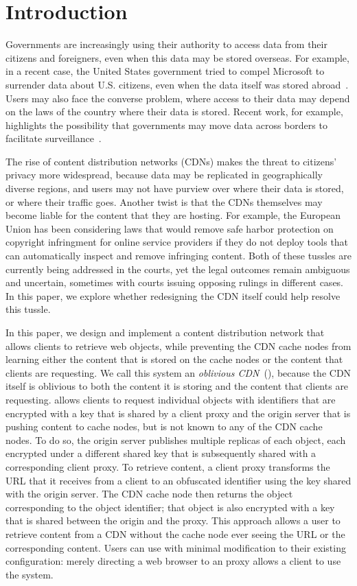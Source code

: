 \section{Introduction}
\label{sec:intro}

Governments are increasingly using their authority to access data from
their citizens and foreigners, even when this data may be stored overseas.  For
example, in a
recent case, the United States government tried to compel Microsoft to
surrender data about U.S. citizens, even when the data itself was stored
abroad~\cite{microsoft_ireland}. Users may also face the converse problem, where access to their data
may depend on the laws of the country where their data is stored. Recent work,
for example, highlights the possibility that governments may move data across
borders to facilitate surveillance~\cite{arnbak2015loopholes}.  

The rise of content distribution networks (CDNs) makes the threat to citizens'
privacy more widespread, because data may be replicated in geographically
diverse regions, and users may not have purview over where their data is
stored, or where their traffic goes. Another twist is that the CDNs themselves
may become liable for the content that they are hosting. For example, the
European Union has been considering laws that would remove safe harbor
protection on copyright infringment for online service providers if they do
not deploy tools that can automatically inspect and remove infringing content.
Both of these tussles are currently being addressed in the courts, yet the
legal outcomes remain ambiguous and uncertain, sometimes with courts issuing
opposing rulings in different cases. In this paper, we explore whether redesigning
the CDN itself could help resolve this tussle.


In this paper, we design and implement a content distribution network that
allows clients to retrieve web objects, while preventing the CDN cache nodes
from learning either the content that is stored on the cache nodes or the
content that clients are requesting. We call this system an {\em oblivious
CDN}~(\system{}), because the CDN itself is oblivious to both the content it is
storing and the content that clients are requesting. \system{} allows clients to
request individual objects with identifiers that are encrypted with a key that
is shared by a client proxy and the origin server that is pushing content to
cache nodes, but is not known to any of the CDN cache nodes.  To do so, the
origin server publishes multiple replicas of each object, each encrypted under
a different shared key that is subsequently shared with a corresponding client
proxy. To retrieve content, a client proxy transforms the URL that it receives
from a client to an obfuscated identifier using the key shared with the origin
server. The CDN cache node then returns the object corresponding to the object
identifier; that object is also encrypted with a key that is shared between
the origin and the proxy. This approach allows a user to retrieve content from
a CDN without the cache node ever seeing the URL or the corresponding content.
Users can use \system{} with minimal modification to their existing configuration:
merely directing a web browser to an \system{} proxy allows a client to use the
system.

